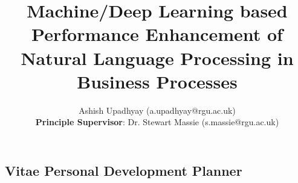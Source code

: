 \documentclass[10pt]{article}
\begin{document}


\title{Machine/Deep Learning based Performance Enhancement of Natural Language Processing in Business Processes}
\author{
Ashish Upadhyay (a.upadhyay@rgu.ac.uk) \\ 
\textbf{Principle Supervisor}: Dr. Stewart Massie (s.massie@rgu.ac.uk)}
\date{}
\maketitle 


\clearpage

\tableofcontents
\clearpage
















\clearpage




\clearpage

\begin{appendices}

% 

\section{Vitae Personal Development Planner}
\label{appendix:vitae}


\end{appendices}
\end{document}

